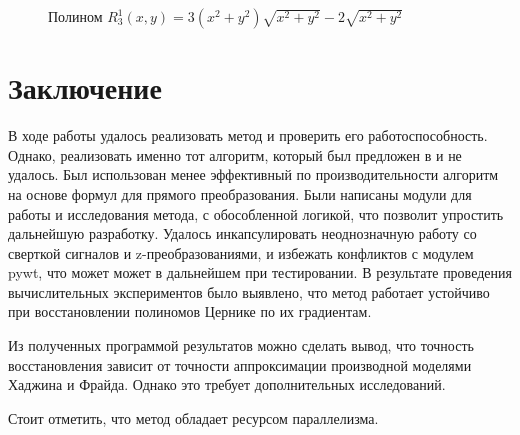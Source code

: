 \documentclass[oneside, final, 14pt]{article}
\begin{document}
\begin{figure}
\caption{Полином $R_3^1(x,y) = 3(x^2 + y^2)\sqrt{x^2 + y^2} - 2\sqrt{x^2 + y^2}$}
\end{figure}

\newpage
\section*{Заключение}
В ходе работы удалось реализовать метод и проверить его работоспособность. Однако, реализовать именно тот алгоритм, который был предложен в \cite{new_method1} и \cite{new_method2} не удалось. Был использован менее эффективный по производительности алгоритм на основе формул для прямого преобразования. Были написаны модули для работы и исследования метода, с обособленной логикой, что позволит упростить дальнейшую разработку. Удалось инкапсулировать неоднозначную работу со сверткой сигналов и z-преобразованиями, и избежать конфликтов с модулем pywt, что может может в дальнейшем при тестировании. В результате проведения вычислительных экспериментов было выявлено, что метод работает устойчиво при восстановлении полиномов Цернике по их градиентам.

Из полученных программой результатов можно сделать вывод, что точность восстановления зависит от точности аппроксимации производной моделями Хаджина и Фрайда. Однако это требует дополнительных исследований. 

Стоит отметить, что метод обладает ресурсом параллелизма.
\newpage

\end{document}
